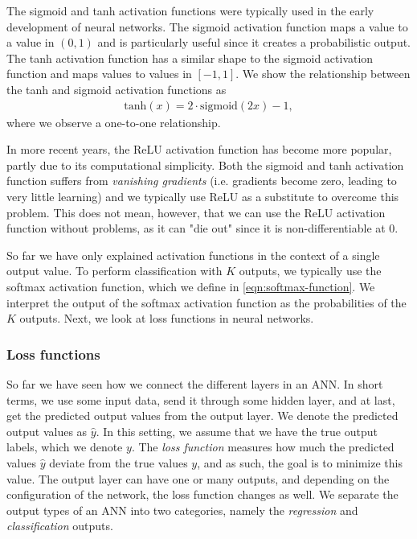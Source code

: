 The sigmoid and tanh activation functions were typically used in the early development of neural networks. The sigmoid activation function maps a value to a value in $(0, 1)$ and is particularly useful since it creates a probabilistic output. The tanh activation function has a similar shape to the sigmoid activation function and maps values to values in $[-1, 1]$. We show the relationship between the tanh and sigmoid activation functions as
\begin{align}
    \label{eqn:tanh-sigmoid-relation}
    \text{tanh}(x) = 2 \cdot \text{sigmoid}(2x) - 1,
\end{align}
where we observe a one-to-one relationship.

In more recent years, the ReLU activation function has become more popular, partly due to its computational simplicity. Both the sigmoid and tanh activation function suffers from \textit{vanishing gradients} (i.e. gradients become zero, leading to very little learning) and we typically use ReLU as a substitute to overcome this problem. This does not mean, however, that we can use the ReLU activation function without problems, as it can "die out" since it is non-differentiable at 0.

So far we have only explained activation functions in the context of a single output value. To perform classification with $K$ outputs, we typically use the softmax activation function, which we define in \cref{eqn:softmax-function}. We interpret the output of the softmax activation function as the probabilities of the $K$ outputs. Next, we look at loss functions in neural networks.

\subsubsection{Loss functions}
\label{sec:ann-loss-functions}
So far we have seen how we connect the different layers in an ANN. In short terms, we use some input data, send it through some hidden layer, and at last, get the predicted output values from the output layer. We denote the predicted output values as $\hat{y}$. In this setting, we assume that we have the true output labels, which we denote $y$. The \textit{loss function} measures how much the predicted values $\hat{y}$ deviate from the true values $y$, and as such, the goal is to minimize this value. The output layer can have one or many outputs, and depending on the configuration of the network, the loss function changes as well. We separate the output types of an ANN into two categories, namely the \textit{regression} and \textit{classification} outputs.

